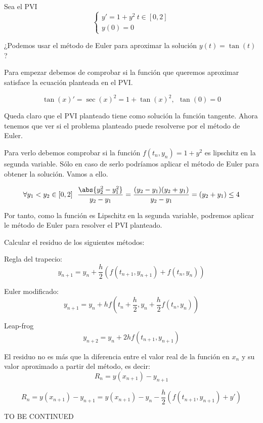 \begin{problem}[3]
Sea el PVI
\[\left\{ \begin{array}{l}y'=1+y^2 \ t \in [0,2] \\
y(0)=0\end{array}
\right.\]

¿Podemos usar el método de Euler para aproximar la solución $y(t)=\tan(t)$?

\solution


Para empezar debemos de comprobar si la función que queremos aproximar satisface la ecuación planteada en el PVI.

\[\tan(x)' = \sec(x)^2 = 1 + \tan(x)^2, \ \ \tan(0)=0\]

Queda claro que el PVI planteado tiene como solución la función tangente. Ahora tenemos que ver si el problema planteado puede resolverse por el método de Euler.

Para verlo debemos comprobar si la función $f(t_n,y_n)=1+y^2$ es lipschitz en la segunda variable. Sólo en caso de serlo podríamos aplicar el método de Euler para obtener la solución. Vamos a ello.

\[\forall y_1<y_2 \in [0,2] \ \ \frac{\abs{y_2^2 - y_1^2}}{y_2-y_1}=\frac{(y_2-y_1)(y_2+y_1)}{y_2-y_1} = (y_2+y_1) \leq 4\]

Por tanto, como la función es Lipschitz en la segunda variable, podremos aplicar le método de Euler para resolver el PVI planteado.
\end{problem}


\begin{problem}[4]
Calcular el residuo de los siguientes métodos:

\ppart Regla del trapecio:
\[y_{n+1} = y_n + \frac{h}{2}\left( f(t_{n+1},y_{n+1})+f(t_n,y_n)\right)\]

\ppart Euler modificado:
\[y_{n+1} = y_n +hf\left( t_n+\frac{h}{2}, y_n+\frac{h}{2}f(t_n,y_n)\right)\]

\ppart Leap-frog
\[y_{n+2}=y_n+2hf(t_{n+1},y_{n+1})\]
\solution


El residuo no es más que la diferencia entre el valor real de la función en $x_n$ y su valor aproximado a partir del método, es decir:
\[R_n = y(x_{n+1})-y_{n+1}\]

\spart
\[R_n = y(x_{n+1})-y_{n+1} = y(x_{n+1})-y_n - \frac{h}{2}\left( f(t_{n+1},y_{n+1})+y'\right)\]

TO BE CONTINUED
\end{problem}

